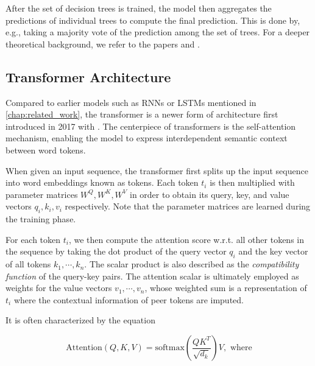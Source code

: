 After the set of decision trees is trained, the model then aggregates the predictions of individual trees to compute the final prediction. This is done by, e.g., taking a majority vote of the prediction among the set of trees. For a deeper theoretical background, we refer to the papers \cite{random-forests-ho} and \cite{random-forest-breiman}.

\subsection{Transformer Architecture}

Compared to earlier models such as RNNs or LSTMs mentioned in \cref{chap:related_work}, the transformer is a newer form of architecture first introduced in 2017 with \cite{attention-is-all-you-need}. The centerpiece of transformers is the self-attention mechanism, enabling the model to express interdependent semantic context between word tokens.

When given an input sequence, the transformer first splits up the input sequence into word embeddings known as tokens. Each token $t_i$ is then multiplied with parameter matrices $W^Q, W^K, W^V$ in order to obtain its query, key, and value vectors $q_i, k_i, v_i$ respectively. Note that the parameter matrices are learned during the training phase. 

For each token $t_i$, we then compute the attention score w.r.t. all other tokens in the sequence by taking the dot product of the query vector $q_i$ and the key vector of all tokens $k_1, \cdots, k_n$. The scalar product is also described as the \emph{compatibility function} of the query-key pairs. The attention scalar is ultimately employed as weights for the value vectors $v_1, \cdots, v_n$, whose weighted sum is a representation of $t_i$ where the contextual information of peer tokens are imputed. 


It is often characterized by the equation

\newcommand*{\vertbar}{\rule[-1ex]{0.5pt}{2.5ex}}
\[
    \text{Attention}(Q, K, V) = \text{softmax} \left( \frac{QK^T}{\sqrt{d_k}} \right) V, \text{ where}
\]


